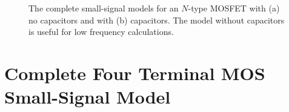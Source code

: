\begin{figure}[t]
\centering
{}
\caption{The complete small-signal models for an $N$-type MOSFET with (a) no capacitors and with (b) capacitors.  The model without capacitors is useful for low frequency calculations.} 
\end{figure}
\section{Complete Four Terminal MOS Small-Signal Model}
